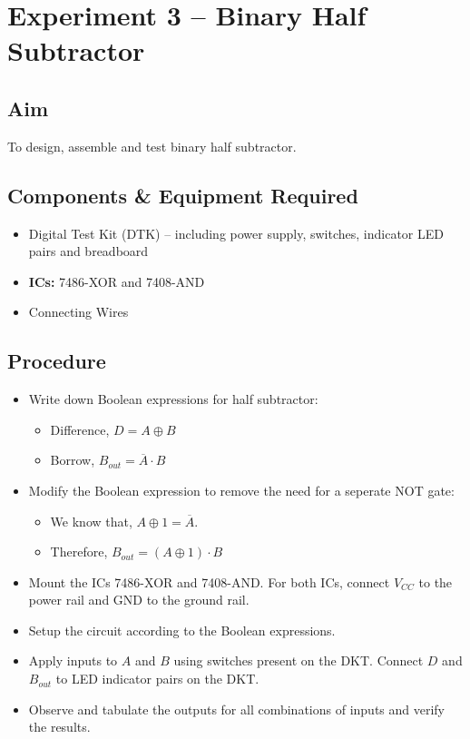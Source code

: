 \documentclass[11pt, a4paper]{article}
\begin{document}
\newpage

\section{Experiment 3 -- Binary Half Subtractor}

\subsection{Aim}
To design, assemble and test binary half subtractor. 

\subsection{Components \& Equipment Required}

\begin{itemize}
    \item Digital Test Kit (DTK) -- including power supply, switches, indicator LED pairs and breadboard
    \item \textbf{ICs:} 7486-XOR and 7408-AND
    \item Connecting Wires
\end{itemize}

\subsection{Procedure}

\begin{itemize}
    \item Write down Boolean expressions for half subtractor:
    \begin{itemize}[label=$\circ$]
        \item Difference, $D = A \oplus B$
        \item Borrow, $B_{out} = \overline{A} \cdot B$
    \end{itemize}
    \item Modify the Boolean expression to remove the need for a seperate NOT gate:
    \begin{itemize}[label=$\circ$]
        \item We know that, $A \oplus 1 = \overline{A}$.
        \item Therefore, $B_{out} = (A \oplus 1) \cdot B$
    \end{itemize}
    \item Mount the ICs 7486-XOR and 7408-AND. For both ICs, connect $V_{CC}$ to the power rail and $\text{GND}$ to the ground rail.
    \item Setup the circuit according to the Boolean expressions.
    \item Apply inputs to $A$ and $B$ using switches present on the DKT. Connect $D$ and $B_{out}$ to LED indicator pairs on the DKT.
    \item Observe and tabulate the outputs for all combinations of inputs and verify the results.
\end{itemize}
\end{document}

